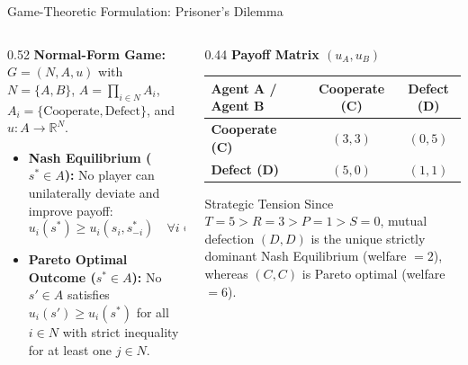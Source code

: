 \documentclass[aspectratio=169, 10pt]{beamer}
\begin{document}
\begin{frame}{Game-Theoretic Formulation: Prisoner's Dilemma}
    \small
    \begin{columns}[T, totalwidth=\textwidth]
        \begin{column}{0.52\textwidth}
            \textbf{Normal-Form Game:} $G = (N, A, u)$ with $N = \{A, B\}$, $A = \prod_{i \in N} A_i$, $A_i = \{\text{Cooperate}, \text{Defect}\}$, and $u: A \to \mathbb{R}^N$.
            \vspace{0.2cm}
            \begin{itemize}
                \setlength{\itemsep}{6pt}
                \item \textbf{Nash Equilibrium ($s^* \in A$):} No player can unilaterally deviate and improve payoff:
                      \[
                          u_i(s^*) \ge u_i(s_i, s_{-i}^*) \quad \forall i \in N,\; \forall s_i \in A_i.
                      \]
                \item \textbf{Pareto Optimal Outcome ($s^* \in A$):} No $s' \in A$ satisfies $u_i(s') \ge u_i(s^*)$ for all $i \in N$ with strict inequality for at least one $j \in N$.
            \end{itemize}
        \end{column}
        \begin{column}{0.44\textwidth}
            \centering
            \textbf{Payoff Matrix $(u_A, u_B)$}
            \vspace{0.2cm}
            \begin{tabular}{lcc}
                \toprule
                \textbf{Agent A / Agent B} & \textbf{Cooperate (C)} & \textbf{Defect (D)} \\
                \midrule
                \textbf{Cooperate (C)}     & $(3, 3)$               & $(0, 5)$            \\
                \textbf{Defect (D)}        & $(5, 0)$               & $(1, 1)$            \\
                \bottomrule
            \end{tabular}
            \vspace{0.3cm}
            \begin{block}{Strategic Tension}
                Since $T=5 > R=3 > P=1 > S=0$, mutual defection $(D,D)$ is the unique strictly dominant Nash Equilibrium (welfare $= 2$), whereas $(C,C)$ is Pareto optimal (welfare $= 6$).
            \end{block}
        \end{column}
    \end{columns}
\end{frame}
\end{document}
